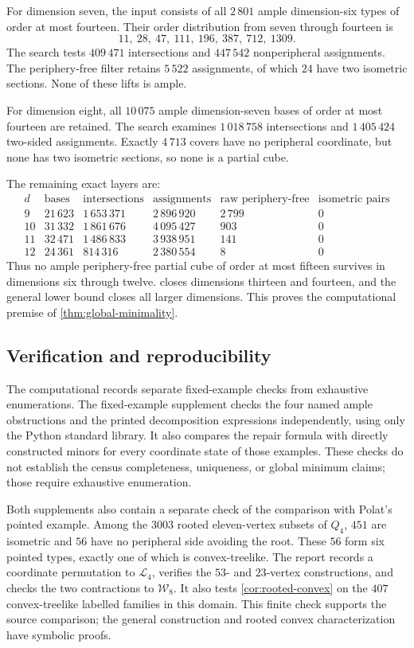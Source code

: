 \documentclass[11pt]{article}
\theoremstyle{definition}
\theoremstyle{remark}
\begin{document}
For dimension seven, the input consists of all \(2\,801\) ample
dimension-six types of order at most fourteen.  Their order distribution
from seven through fourteen is
\[
 11,\ 28,\ 47,\ 111,\ 196,\ 387,\ 712,\ 1309.
\]
The search tests \(409\,471\) intersections and \(447\,542\) nonperipheral
assignments. The periphery-free filter retains \(5\,522\) assignments,
of which \(24\) have two isometric sections. None of these lifts is ample.

For dimension eight, all \(10\,075\) ample dimension-seven bases of order
at most fourteen are retained.  The search examines \(1\,018\,758\)
intersections and \(1\,405\,424\) two-sided assignments.  Exactly \(4\,713\)
covers have no peripheral coordinate, but none has two isometric sections,
so none is a partial cube.

The remaining exact layers are:
\[
\begin{array}{c|r|r|r|r|r}
d&\text{bases}&\text{intersections}&\text{assignments}&
 \text{raw periphery-free}&\text{isometric pairs}\\ \hline
9  &21\,623&1\,653\,371&2\,896\,920&2\,799&0\\
10 &31\,332&1\,861\,676&4\,095\,427&903&0\\
11 &32\,471&1\,486\,833&3\,938\,951&141&0\\
12 &24\,361&814\,316&2\,380\,554&8&0
\end{array}
\]
Thus no ample periphery-free partial cube of order at most fifteen survives in
dimensions six through twelve.   closes dimensions
thirteen and fourteen, and the general lower bound closes all larger
dimensions.  This proves the computational premise of
\cref{thm:global-minimality}.

\subsection{Verification and reproducibility}

The computational records separate fixed-example checks from exhaustive
enumerations. The fixed-example supplement checks the four named ample
obstructions and the printed decomposition expressions independently, using
only the Python standard library. It also compares the repair formula with
directly constructed minors for every coordinate state of those examples.
These checks do not establish the census completeness, uniqueness, or global
minimum claims; those require exhaustive enumeration.

Both supplements also contain a separate check of the comparison with
Polat's pointed example. Among the \(3003\) rooted eleven-vertex subsets
of \(Q_4\), \(451\) are isometric and \(56\) have no peripheral side
avoiding the root. These \(56\) form six pointed types, exactly one of
which is convex-treelike.
The report records a coordinate permutation to \(\mathcal L_4\), verifies
the \(53\)- and \(23\)-vertex constructions, and checks the two
contractions to \(\mathcal W_8\). It also tests
\cref{cor:rooted-convex} on the \(407\) convex-treelike labelled families
in this domain. This finite check supports the source comparison; the
general construction and rooted convex characterization have symbolic proofs.
\end{document}

